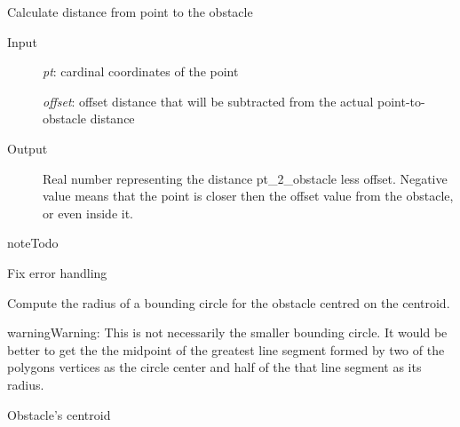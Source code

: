 \documentclass[letterpaper,10pt,english]{sphinxmanual}
\begin{document}
\begin{fulllineitems}
\begin{fulllineitems}
\label{Multi-robot motion planner:planning_sim.PolygonObstacle.pt_2_obst}
Calculate distance from point to the obstacle
\begin{description}
\item[{Input}] \leavevmode
\emph{pt}: cardinal coordinates of the point

\emph{offset}: offset distance that will be subtracted from the actual
point-to-obstacle distance

\item[{Output}] \leavevmode
Real number representing the distance pt\_2\_obstacle less offset. Negative value means
that the point is closer then the offset value from the obstacle, or even inside it.

\end{description}

\begin{notice}{note}{Todo}

Fix error handling
\end{notice}

\end{fulllineitems}


\begin{fulllineitems}
\label{Multi-robot motion planner:planning_sim.PolygonObstacle.bounding_circle_radius}
Compute the radius of a bounding circle for the obstacle centred on the centroid.

\begin{notice}{warning}{Warning:}
This is not necessarily the smaller bounding circle. It would be better to
get the the midpoint of the greatest line segment formed by two of the
polygons vertices as the circle center and half of the that line segment
as its radius.
\end{notice}

\end{fulllineitems}


\begin{fulllineitems}
\label{Multi-robot motion planner:planning_sim.PolygonObstacle.centroid}
Obstacle's centroid


\end{fulllineitems}
\end{fulllineitems}
\end{document}
